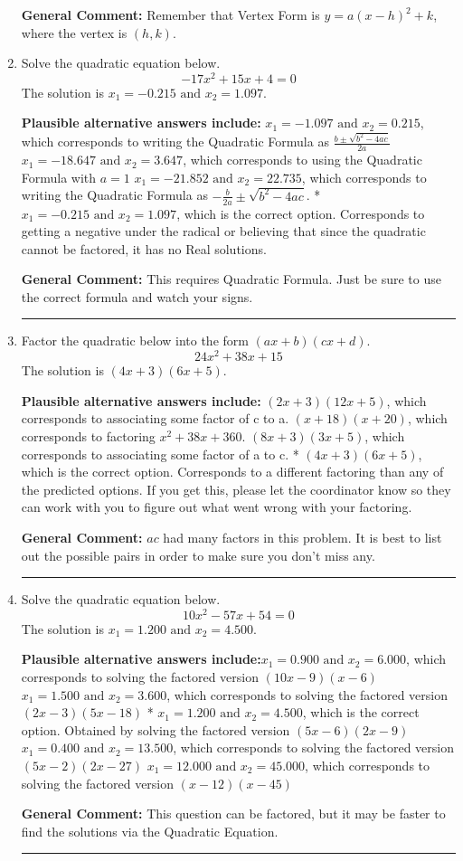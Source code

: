 \documentclass{extbook}[14pt]
\newcommand{\litem}[1]{\item #1

\rule{\textwidth}{0.4pt}}
\begin{document}
\begin{enumerate}
{\textbf{General Comment:} Remember that Vertex Form is $y = a(x-h)^2+k$, where the vertex is $(h, k)$.
}
\litem{
Solve the quadratic equation below.
\[ -17x^{2} +15 x + 4 = 0 \]The solution is \( x_1 = -0.215 \text{ and } x_2 = 1.097 \).\begin{enumerate}[label=\Alph*.]
\textbf{Plausible alternative answers include:} $x_1 = -1.097 \text{ and } x_2 = 0.215$, which corresponds to writing the Quadratic Formula as $\frac{b \pm \sqrt{b^2 - 4ac}}{2a}$
 $x_1 = -18.647 \text{ and } x_2 = 3.647$, which corresponds to using the Quadratic Formula with $a=1$
 $x_1 = -21.852 \text{ and } x_2 = 22.735$, which corresponds to writing the Quadratic Formula as $-\frac{b}{2a} \pm \sqrt{b^2 - 4ac}$.
* $x_1 = -0.215 \text{ and } x_2 = 1.097$, which is the correct option.
Corresponds to getting a negative under the radical or believing that since the quadratic cannot be factored, it has no Real solutions.
\end{enumerate}

\textbf{General Comment:} This requires Quadratic Formula. Just be sure to use the correct formula and watch your signs.
}
\litem{
Factor the quadratic below into the form $(ax+b)(cx+d)$.
\[ 24x^{2} +38 x + 15 \]The solution is \( (4x + 3)(6x + 5) \).\begin{enumerate}[label=\Alph*.]
\textbf{Plausible alternative answers include:} $(2x + 3)(12x + 5)$, which corresponds to associating some factor of c to a.
 $(x + 18)(x + 20)$, which corresponds to factoring $x^{2} +38 x + 360$.
 $(8x + 3)(3x + 5)$, which corresponds to associating some factor of a to c.
* $(4x + 3)(6x + 5)$, which is the correct option.
 Corresponds to a different factoring than any of the predicted options. If you get this, please let the coordinator know so they can work with you to figure out what went wrong with your factoring.
\end{enumerate}

\textbf{General Comment:} $ac$ had many factors in this problem. It is best to list out the possible pairs in order to make sure you don't miss any.
}
\litem{
Solve the quadratic equation below.
\[ 10x^{2} -57 x + 54 = 0 \]The solution is \( x_1 = 1.200 \text{ and } x_2 = 4.500 \).\begin{enumerate}[label=\Alph*.]
\textbf{Plausible alternative answers include:}$x_1 = 0.900 \text{ and } x_2 = 6.000$, which corresponds to solving the factored version $(10x -9)(x -6)$
$x_1 = 1.500 \text{ and } x_2 = 3.600$, which corresponds to solving the factored version $(2x -3)(5x -18)$
* $x_1 = 1.200 \text{ and } x_2 = 4.500$, which is the correct option. Obtained by solving the factored version $(5x -6)(2x -9)$
$x_1 = 0.400 \text{ and } x_2 = 13.500$, which corresponds to solving the factored version $(5x -2)(2x -27)$
$x_1 = 12.000 \text{ and } x_2 = 45.000$, which corresponds to solving the factored version $(x -12)(x -45)$
\end{enumerate}

\textbf{General Comment:} This question can be factored, but it may be faster to find the solutions via the Quadratic Equation.
}
\end{enumerate}
\end{document}
